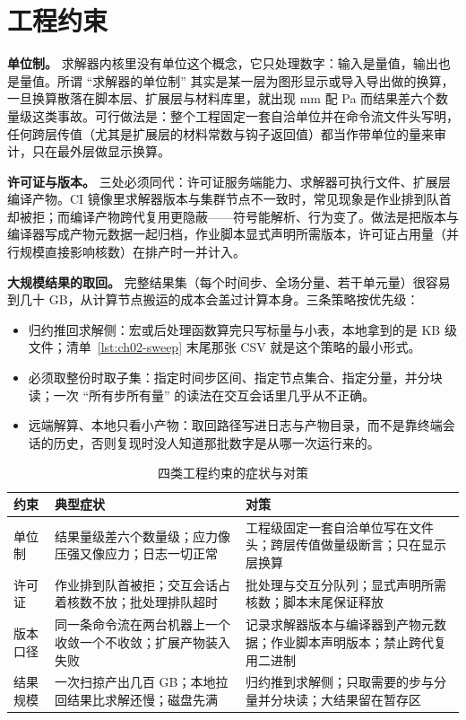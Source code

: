 \documentclass[12pt,a4paper,fontset=fandol]{ctexbook}
\begin{document}
\section{工程约束}
\label{sec:ch02-constraints}

\textbf{单位制。} 求解器内核里没有单位这个概念，它只处理数字：输入是量值，输出也是量值。所谓 ``求解器的单位制'' 其实是某一层为图形显示或导入导出做的换算，一旦换算散落在脚本层、扩展层与材料库里，就出现 mm 配 Pa 而结果差六个数量级这类事故。可行做法是：整个工程固定一套自洽单位并在命令流文件头写明，任何跨层传值（尤其是扩展层的材料常数与钩子返回值）都当作带单位的量来审计，只在最外层做显示换算。

\textbf{许可证与版本。} 三处必须同代：许可证服务端能力、求解器可执行文件、扩展层编译产物。CI 镜像里求解器版本与集群节点不一致时，常见现象是作业排到队首却被拒；而编译产物跨代复用更隐蔽——符号能解析、行为变了。做法是把版本与编译器写成产物元数据一起归档，作业脚本显式声明所需版本，许可证占用量（并行规模直接影响核数）在排产时一并计入。

\textbf{大规模结果的取回。} 完整结果集（每个时间步、全场分量、若干单元量）很容易到几十 GB，从计算节点搬运的成本会盖过计算本身。三条策略按优先级：

\begin{itemize}
\item 归约推回求解侧：宏或后处理函数算完只写标量与小表，本地拿到的是 KB 级文件；清单~\ref{lst:ch02-sweep} 末尾那张 CSV 就是这个策略的最小形式。
\item 必须取整份时取子集：指定时间步区间、指定节点集合、指定分量，并分块读；一次 ``所有步所有量'' 的读法在交互会话里几乎从不正确。
\item 远端解算、本地只看小产物：取回路径写进日志与产物目录，而不是靠终端会话的历史，否则复现时没人知道那批数字是从哪一次运行来的。
\end{itemize}

\begin{table}[htbp]
\centering
\caption{四类工程约束的症状与对策}
\label{tab:ch02-constraints}
\begin{tabular}{>{\raggedright\arraybackslash}p{}
                >{\raggedright\arraybackslash}p{}
                >{\raggedright\arraybackslash}p{}}
\toprule
\textbf{约束} & \textbf{典型症状} & \textbf{对策} \\
\midrule
单位制 & 结果量级差六个数量级；应力像压强又像应力；日志一切正常 & 工程级固定一套自洽单位写在文件头；跨层传值做量级断言；只在显示层换算 \\
许可证 & 作业排到队首被拒；交互会话占着核数不放；批处理排队超时 & 批处理与交互分队列；显式声明所需核数；脚本末尾保证释放 \\
版本口径 & 同一条命令流在两台机器上一个收敛一个不收敛；扩展产物装入失败 & 记录求解器版本与编译器到产物元数据；作业脚本声明版本；禁止跨代复用二进制 \\
结果规模 & 一次扫掠产出几百 GB；本地拉回结果比求解还慢；磁盘先满 & 归约推到求解侧；只取需要的步与分量并分块读；大结果留在暂存区 \\
\bottomrule
\end{tabular}
\end{table}
\end{document}
